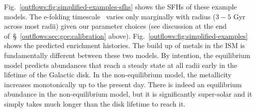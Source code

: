 Fig.~\ref{outflows:fig:simplified-examples-sfhs} shows the SFHs of these
example models.
The e-folding timescale~ varies only marginally with radius
($3 - 5$ Gyr across most radii) given our parameter choices (see discussion
at the end of~\S~\ref{outflows:sec:gce:calibration} above).
Fig.~\ref{outflows:fig:simplified-examples} shows the predicted enrichment
histories.
The build up of metals in the ISM is fundamentally different between these two
models.
By intention, the equilibrium model predicts abundances that reach a steady
state at all radii early in the lifetime of the Galactic disk.
In the non-equilibrium model, the metallicity increases monotonically up to the
present day.
There is indeed an equilibrium abundance in the non-equilibrium model, but it
is significantly super-solar and it simply takes much longer than the disk
lifetime to reach it.

